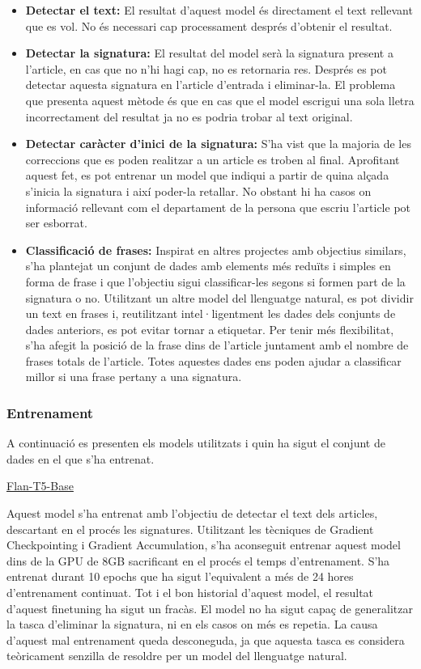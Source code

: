 \begin{itemize}
     \item \textbf{Detectar el text:} El resultat d'aquest model és directament el text rellevant que es vol. No és necessari cap processament després d'obtenir el resultat.
     \item \textbf{Detectar la signatura:} El resultat del model serà la signatura present a l'article, en cas que no n'hi hagi cap, no es retornaria res. Després es pot detectar aquesta signatura en l'article d'entrada i eliminar-la. El problema que presenta aquest mètode és que en cas que el model escrigui una sola lletra incorrectament del resultat ja no es podria trobar al text original.
     \item \textbf{Detectar caràcter d'inici de la signatura:} S'ha vist que la majoria de les correccions que es poden realitzar a un article es troben al final. Aprofitant aquest fet, es pot entrenar un model que indiqui a partir de quina alçada s'inicia la signatura i així poder-la retallar. No obstant hi ha casos on informació rellevant com el departament de la persona que escriu l'article pot ser esborrat.
     \item \textbf{Classificació de frases:} Inspirat en altres projectes amb objectius similars, s'ha plantejat un conjunt de dades amb elements més reduïts i simples en forma de frase i que l'objectiu sigui classificar-les segons si formen part de la signatura o no. Utilitzant un altre model del llenguatge natural, es pot dividir un text en frases i, reutilitzant intel·ligentment les dades dels conjunts de dades anteriors, es pot evitar tornar a etiquetar. Per tenir més flexibilitat, s'ha afegit la posició de la frase dins de l'article juntament amb el nombre de frases totals de l'article. Totes aquestes dades ens poden ajudar a classificar millor si una frase pertany a una signatura.
\end{itemize}

\subsubsection{Entrenament}
A continuació es presenten els models utilitzats i quin ha sigut el conjunt de dades en el que s'ha entrenat.

\underline{Flan-T5-Base}

Aquest model s'ha entrenat amb l'objectiu de detectar el text dels articles, descartant en el procés les signatures. Utilitzant les tècniques de Gradient Checkpointing i Gradient Accumulation, s'ha aconseguit entrenar aquest model dins de la GPU de 8GB sacrificant en el procés el temps d'entrenament. S'ha entrenat durant 10 epochs que ha sigut l'equivalent a més de 24 hores d'entrenament continuat.
Tot i el bon historial d'aquest model, el resultat d'aquest finetuning ha sigut un fracàs. El model no ha sigut capaç de generalitzar la tasca d'eliminar la signatura, ni en els casos on més es repetia. La causa d'aquest mal entrenament queda desconeguda, ja que aquesta tasca es considera teòricament senzilla de resoldre per un model del llenguatge natural.

